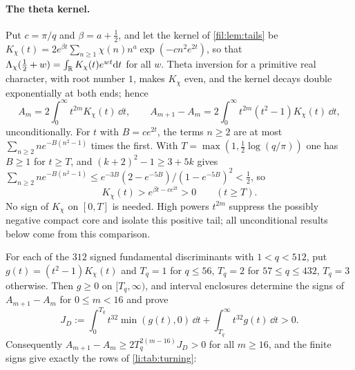 \paragraph{The theta kernel.} Put $c=\pi/q$ and $\beta=a+\frac12$, and let the kernel of
\cref{fil:lem:tails} be $K_\chi(t)=2e^{\beta t}\sum_{n\ge1}\chi(n)n^a\exp(-cn^2e^{2t})$, so that
$\Lambda_\chi(\frac12+w)=\int_{\mathbb{R}} K_\chi(t)e^{wt}\mathrm{d} t$ for all $w$. Theta inversion for a primitive real
character, with root number $1$, makes $K_\chi$ even, and the kernel decays double exponentially at
both ends; hence
\begin{equation}\label{li:eq:centralkernel}
 A_m=2\int_0^\infty t^{2m}K_\chi(t)\,\dd t,\qquad
 A_{m+1}-A_m=2\int_0^\infty t^{2m}(t^2-1)K_\chi(t)\,\dd t,
\end{equation}
unconditionally. For $t$ with $B=ce^{2t}$, the terms $n\ge2$ are at most
$\sum_{n\ge2}ne^{-B(n^2-1)}$ times the first. With $T=\max(1,\frac12\log(q/\pi))$ one has $B\ge1$ for
$t\ge T$, and $(k+2)^2-1\ge3+5k$ gives $\sum_{n\ge2}ne^{-B(n^2-1)}\le e^{-3B}(2-e^{-5B})/(1-e^{-5B})^2<\frac12$,
so
\begin{equation}\label{li:eq:centraltail}
 K_\chi(t)>e^{\beta t-ce^{2t}}>0\qquad(t\ge T).
\end{equation}
No sign of $K_\chi$ on $[0,T]$ is needed. High powers $t^{2m}$ suppress the possibly negative compact
core and isolate this positive tail; all unconditional results below come from this comparison.

\begin{proposition}\label{li:prop:turning512}
For each of the $312$ signed fundamental discriminants with $1<q<512$, put $g(t)=(t^2-1)K_\chi(t)$ and
$T_q=1$ for $q\le56$, $T_q=2$ for $57\le q\le432$, $T_q=3$ otherwise. Then $g\ge0$ on $[T_q,\infty)$, and
interval enclosures determine the signs of $A_{m+1}-A_m$ for $0\le m<16$ and prove
\[
 J_D:=\int_0^{T_q}t^{32}\min(g(t),0)\,\dd t+\int_{T_q}^\infty t^{32}g(t)\,\dd t>0.
\]
Consequently $A_{m+1}-A_m\ge2T_q^{2(m-16)}J_D>0$ for all $m\ge16$, and the finite signs give exactly the
rows of \cref{li:tab:turning}:
\begin{center}\small
{}
\end{center}
\end{proposition}

